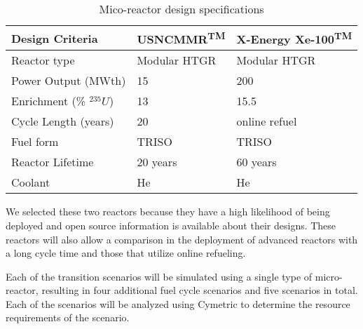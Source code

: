 \begin{table}
    \caption{Mico-reactor design specifications}
    \label{tab:reactor_summary}
    \begin{tabular}{|p{2.5cm}|p{2.25cm}|p{2.5cm}|}
        \hline
        Design Criteria & \gls{USNC}\gls{MMR}\textsuperscript{TM} & 
            X-Energy Xe-100\textsuperscript{TM} \\\hline
        Reactor type & Modular HTGR & Modular HTGR \\
        Power Output (MWth) & 15 & 200 \\
        Enrichment (\% $^{235}U$) & 13 & 15.5 \\
        Cycle Length (years) & 20 & online refuel\\
        Fuel form & \gls{TRISO} & \gls{TRISO} \\
        Reactor Lifetime & 20 years & 60 years \\
        Coolant & He & He \\
        \hline
    \end{tabular}
\end{table}
    
We selected these two reactors because they have a high 
likelihood of being deployed and open source information is available about 
their designs. These reactors will also allow a comparison in the 
deployment of advanced reactors with a long cycle time and those that 
utilize online refueling. 

Each of the transition scenarios will be simulated using a single type of 
micro-reactor, resulting in four additional fuel cycle scenarios and five 
scenarios in total. Each of the scenarios will be analyzed using Cymetric
\cite{scopatz_cymetric_2015} to determine the resource requirements of the 
scenario. 